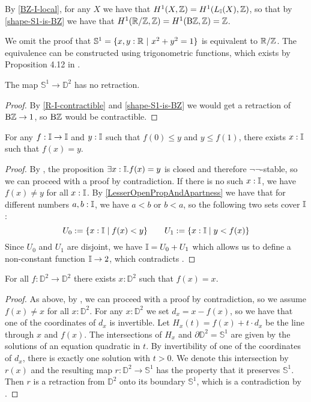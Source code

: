 \begin{remark}
By \cref{BZ-I-local}, for any $X$ we have that $H^1(X,\mathbb{Z}) = H^1(L_{\mathbb{I}}(X),\mathbb{Z})$, so that by \cref{shape-S1-is-BZ} we have that $H^1(\mathbb{R}/\mathbb{Z},\mathbb{Z}) = H^1(\mathrm{B}\mathbb{Z},\mathbb{Z}) = \mathbb{Z}$.
\end{remark}

We omit the proof that $\mathbb{S}^1=\{x,y:\mathbb{R}\ \vert\ x^2+y^2=1\}$ is equivalent to $\mathbb{R}/\mathbb{Z}$.
The equivalence can be constructed using trigonometric functions, which exists by Proposition 4.12 in \cite{Bishop}.

\begin{proposition}
\label{no-retraction}
The map $\mathbb{S}^1\to \mathbb{D}^2$ has no retraction.
\end{proposition}

\begin{proof}
By \cref{R-I-contractible} and \cref{shape-S1-is-BZ} we would get a retraction of $\mathrm{B}\mathbb{Z}\to 1$, so $\mathrm{B}\mathbb{Z}$ would be contractible.
\end{proof}

\begin{theorem}
  \label{ivt}
  For any $f: \mathbb{I}\to \mathbb{I}$ and $y:\mathbb{I}$ such that $f(0)\leq y$ and $y\leq f(1)$,
  there exists $x:\mathbb{I}$ such that $f(x)=y$.
\end{theorem}

\begin{proof}
  By , the proposition $\exists x:\mathbb{I}.f(x)=y$ is closed and therefore $\neg\neg$-stable, so we can proceed with a proof by contradiction.
  If there is no such $x:\mathbb{I}$, we have $f(x)\neq y$ for all $x:\mathbb{I}$.
  By \cref{LesserOpenPropAndApartness} we have that for different numbers $a,b:\mathbb{I}$, we have $a<b$ or $b<a$, so the following two sets cover $\mathbb{I}$:
  \[
    U_0:= \{x:\mathbb{I}\mid f(x)<y\} \quad\quad
    U_1:= \{x:\mathbb{I}\mid y<f(x)\}
    \]
  Since $U_0$ and $U_1$ are disjoint, we have $\mathbb{I}=U_0+U_1$ which allows us to define a non-constant function $\mathbb{I}\to 2$, which contradicts .
\end{proof}

\begin{theorem}
  For all $f:\mathbb{D}^2\to \mathbb{D}^2$ there exists $x:\mathbb{D}^2$ such that $f(x)=x$.
\end{theorem}

\begin{proof}
  As above, by , we can proceed with a proof by contradiction,
  so we assume $f(x)\neq x$ for all $x:\mathbb{D}^2$.
  For any $x:\mathbb{D}^2$ we set $d_x= x-f(x)$, so we have that one of the coordinates of $d_x$ is invertible.
  Let $H_x(t) = f(x) + t\cdot d_x $ be the line through $x$ and $f(x)$.
  The intersections of $H_x$ and $\partial\mathbb{D}^2=\mathbb{S}^1$ are given by the solutions of an equation quadratic in $t$. By invertibility of one of the coordinates of $d_x$, there is exactly one solution with $t> 0$.
  We denote this intersection by $r(x)$ and the resulting map $r:\mathbb D^2\to\mathbb S^1$ has the property that it preserves $\mathbb{S}^1$.
  Then $r$ is a retraction from $\mathbb{D}^2$ onto its boundary $\mathbb{S}^1$, which is a contradiction by .
\end{proof}

